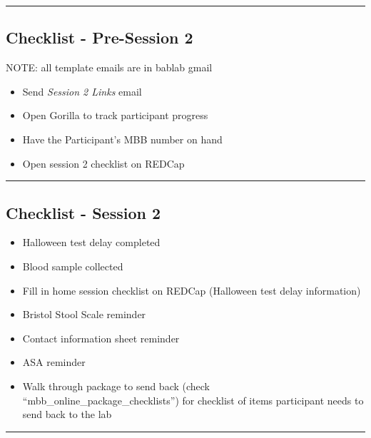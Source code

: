 \documentclass[]{book}
\providecommand{\tightlist}{%
  \setlength{\itemsep}{0pt}\setlength{\parskip}{0pt}}
\begin{document}
\begin{center}\rule{0.5\linewidth}{0.5pt}\end{center}

\hypertarget{checklist---pre-session-2-2}{%
\subsection{Checklist - Pre-Session 2}\label{checklist---pre-session-2-2}}

NOTE: all template emails are in bablab gmail

\begin{itemize}
\tightlist
\item
  Send \emph{Session 2 Links} email
\item
  Open Gorilla to track participant progress
\item
  Have the Participant's MBB number on hand
\item
  Open session 2 checklist on REDCap
\end{itemize}

\begin{center}\rule{0.5\linewidth}{0.5pt}\end{center}

\hypertarget{checklist---session-2-2}{%
\subsection{Checklist - Session 2}\label{checklist---session-2-2}}

\begin{itemize}
\tightlist
\item
  Halloween test delay completed
\item
  Blood sample collected\\
\item
  Fill in home session checklist on REDCap (Halloween test delay information)
\item
  Bristol Stool Scale reminder
\item
  Contact information sheet reminder
\item
  ASA reminder
\item
  Walk through package to send back (check ``mbb\_online\_package\_checklists'') for checklist of items participant needs to send back to the lab
\end{itemize}

\begin{center}\rule{0.5\linewidth}{0.5pt}\end{center}
\end{document}
